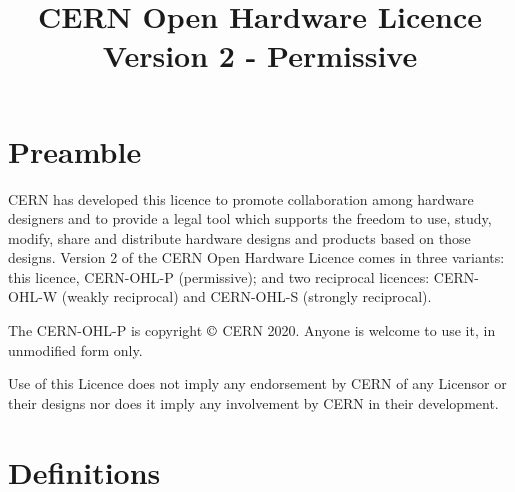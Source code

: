 \documentclass[10pt, a4paper]{article}
\title{CERN Open Hardware Licence Version 2 - Permissive}
\date{}
\begin{document}
\maketitle

\section*{Preamble}

CERN has developed this licence to promote collaboration among hardware designers and to provide a legal tool which supports the freedom to use, study, modify, share and distribute hardware designs and products based
on those designs. Version 2 of the CERN Open Hardware Licence comes in three variants: this licence, CERN-OHL-P (permissive); and two reciprocal licences: CERN-OHL-W (weakly reciprocal) and CERN-OHL-S (strongly reciprocal).

The CERN-OHL-P is copyright $\copyright$ CERN 2020. Anyone is welcome to use it, in unmodified form only.

Use of this Licence does not imply any endorsement by CERN of any Licensor or their designs nor does it imply any involvement by CERN in their development.

\section{Definitions}
\label{sec:definitions}
\end{document}
